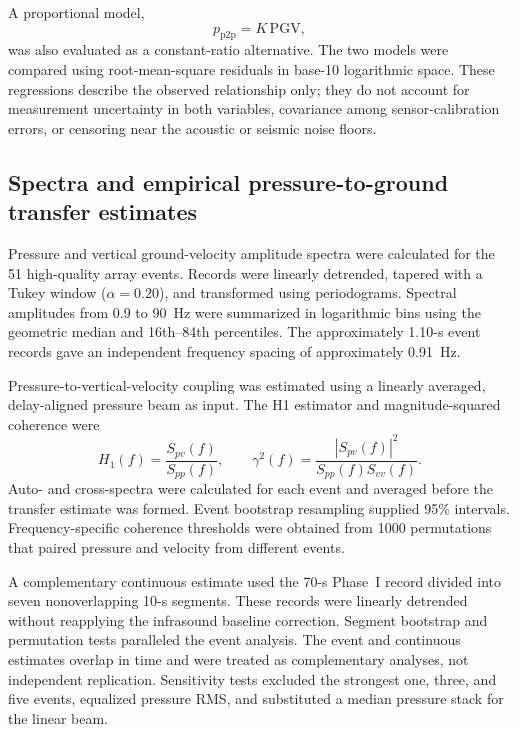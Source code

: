 \documentclass[]{seismica}
\begin{document}
A proportional model,
\begin{equation}
  p_{\mathrm{p2p}} = K\,\mathrm{PGV},
  \label{eq:proportional_model}
\end{equation}
was also evaluated as a constant-ratio alternative. The two models were compared using root-mean-square residuals in base-10 logarithmic space. These regressions describe the observed relationship only; they do not account for measurement uncertainty in both variables, covariance among sensor-calibration errors, or censoring near the acoustic or seismic noise floors.

\subsection{Spectra and empirical pressure-to-ground transfer estimates}

Pressure and vertical ground-velocity amplitude spectra were calculated for the
51 high-quality array events. Records were linearly detrended, tapered with a
Tukey window ($\alpha=0.20$), and transformed using periodograms. Spectral
amplitudes from 0.9 to 90~Hz were summarized in logarithmic bins using the
geometric median and 16th--84th percentiles. The approximately 1.10-s event
records gave an independent frequency spacing of approximately 0.91~Hz.

Pressure-to-vertical-velocity coupling was estimated using a linearly averaged,
delay-aligned pressure beam as input. The H1 estimator and magnitude-squared
coherence were
\begin{equation}
  H_1(f)=\frac{S_{pv}(f)}{S_{pp}(f)}, \qquad
  \gamma^2(f)=\frac{|S_{pv}(f)|^2}{S_{pp}(f)S_{vv}(f)}.
  \label{eq:h1_transfer}
\end{equation}
Auto- and cross-spectra were calculated for each event and averaged before the
transfer estimate was formed. Event bootstrap resampling supplied 95\%
intervals. Frequency-specific coherence thresholds were obtained from 1000
permutations that paired pressure and velocity from different events.

A complementary continuous estimate used the 70-s Phase~I record divided into
seven nonoverlapping 10-s segments. These records were linearly detrended
without reapplying the infrasound baseline correction. Segment bootstrap and
permutation tests paralleled the event analysis. The event and continuous
estimates overlap in time and were treated as complementary analyses, not
independent replication. Sensitivity tests excluded the strongest one, three,
and five events, equalized pressure RMS, and substituted a median pressure
stack for the linear beam.
\end{document}
